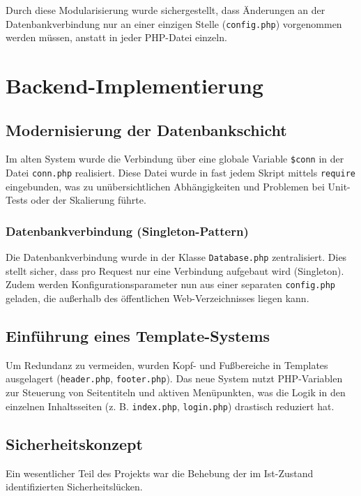 \documentclass[11pt,
a4paper,
numbers=nonperiod,
footsepline,
oneside,
numbers=noenddot,
bibliography=totoc
]{scrreprt}
\begin{document}
Durch diese Modularisierung wurde sichergestellt, dass Änderungen an der Datenbankverbindung nur an einer einzigen Stelle (\texttt{config.php}) vorgenommen werden müssen, anstatt in jeder PHP-Datei einzeln.

\chapter{Backend-Implementierung}

\section{Modernisierung der Datenbankschicht}
Im alten System wurde die Verbindung über eine globale Variable \texttt{\$conn} in der Datei \texttt{conn.php} realisiert. Diese Datei wurde in fast jedem Skript mittels \texttt{require} eingebunden, was zu unübersichtlichen Abhängigkeiten und Problemen bei Unit-Tests oder der Skalierung führte.

\subsection{Datenbankverbindung (Singleton-Pattern)}
Die Datenbankverbindung wurde in der Klasse \texttt{Database.php} zentralisiert. Dies stellt sicher, dass pro Request nur eine Verbindung aufgebaut wird (Singleton). Zudem werden Konfigurationsparameter nun aus einer separaten \texttt{config.php} geladen, die außerhalb des öffentlichen Web-Verzeichnisses liegen kann.

\section{Einführung eines Template-Systems}
Um Redundanz zu vermeiden, wurden Kopf- und Fußbereiche in Templates ausgelagert (\texttt{header.php}, \texttt{footer.php}). Das neue System nutzt PHP-Variablen zur Steuerung von Seitentiteln und aktiven Menüpunkten, was die Logik in den einzelnen Inhaltsseiten (z. B. \texttt{index.php}, \texttt{login.php}) drastisch reduziert hat.

\section{Sicherheitskonzept}
Ein wesentlicher Teil des Projekts war die Behebung der im Ist-Zustand identifizierten Sicherheitslücken.
\end{document}

